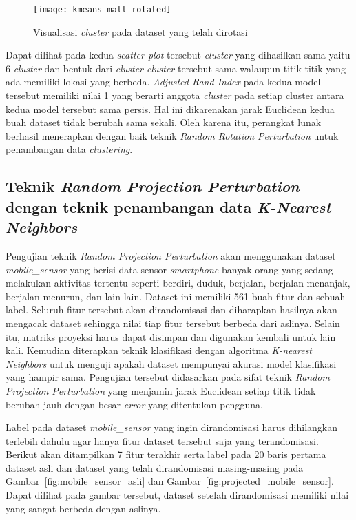 \begin{figure}
	\centering
	\texttt{[image: kmeans\_mall\_rotated]}
	\caption{Visualisasi \textit{cluster} pada dataset yang telah dirotasi}
	\label{fig:kmeans_mall_rotated}
\end{figure}

Dapat dilihat pada kedua \textit{scatter plot} tersebut \textit{cluster} yang dihasilkan sama yaitu 6 \textit{cluster} dan bentuk dari \textit{cluster-cluster} tersebut sama walaupun titik-titik yang ada memiliki lokasi yang berbeda. \textit{Adjusted Rand Index} pada kedua model tersebut memiliki nilai 1 yang berarti anggota \textit{cluster} pada setiap cluster antara kedua model tersebut sama persis. Hal ini dikarenakan jarak Euclidean kedua buah dataset tidak berubah sama sekali. Oleh karena itu, perangkat lunak berhasil menerapkan dengan baik teknik \textit{Random Rotation Perturbation} untuk penambangan data \textit{clustering}.

\subsection{Teknik \textit{Random Projection Perturbation} dengan teknik penambangan data \textit{K-Nearest Neighbors}}
\label{sec:rpp-knn}

Pengujian teknik \textit{Random Projection Perturbation} akan menggunakan dataset \textit{mobile\_sensor} yang berisi data sensor \textit{smartphone} banyak orang yang sedang melakukan aktivitas tertentu seperti berdiri, duduk, berjalan, berjalan menanjak, berjalan menurun, dan lain-lain. Dataset ini memiliki 561 buah fitur dan sebuah label. Seluruh fitur tersebut akan dirandomisasi dan diharapkan hasilnya akan mengacak dataset sehingga nilai tiap fitur tersebut berbeda dari aslinya. Selain itu, matriks proyeksi harus dapat disimpan dan digunakan kembali untuk lain kali. Kemudian diterapkan teknik klasifikasi dengan algoritma \textit{K-nearest Neighbors} untuk menguji apakah dataset mempunyai akurasi model klasifikasi yang hampir sama. Pengujian tersebut didasarkan pada sifat teknik \textit{Random Projection Perturbation} yang menjamin jarak Euclidean setiap titik tidak berubah jauh dengan besar \textit{error} yang ditentukan pengguna.

Label pada dataset \textit{mobile\_sensor} yang ingin dirandomisasi harus dihilangkan terlebih dahulu agar hanya fitur dataset tersebut saja yang terandomisasi. Berikut akan ditampilkan 7 fitur terakhir serta label pada 20 baris pertama dataset asli dan dataset yang telah dirandomisasi masing-masing pada Gambar~\ref{fig:mobile_sensor_asli} dan Gambar~\ref{fig:projected_mobile_sensor}. Dapat dilihat pada gambar tersebut, dataset setelah dirandomisasi memiliki nilai yang sangat berbeda dengan aslinya. 

